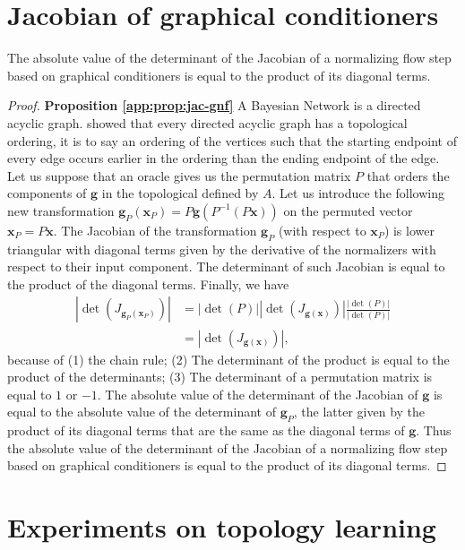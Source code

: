 \section{Jacobian of graphical conditioners}\label{app:proof-jac-gnf}
\begin{proposition}\label{app:prop:jac-gnf}
The absolute value of the determinant of the Jacobian of a normalizing flow step based on graphical conditioners is equal to the product of its diagonal terms. 
\end{proposition}
\begin{proof} \textbf{Proposition \ref{app:prop:jac-gnf}}
A Bayesian Network is a directed acyclic graph. \cite{sedgewick2011algorithms} showed that every directed acyclic graph has a topological ordering, it is to say an ordering of the vertices such that the starting endpoint of every edge occurs earlier in the ordering than the ending endpoint of the edge. Let us suppose that an oracle gives us the permutation matrix $P$ that orders the components of $\mathbf{g}$ in the topological defined by $A$. Let us introduce the following new transformation $\mathbf{g}_P(\mathbf{x}_P) = P\mathbf{g}(P
^{-1}(P\mathbf{x}))$ on the permuted vector $\mathbf{x}_P = P\mathbf{x}$. The Jacobian of the transformation $\mathbf{g}_P$ (with respect to $\mathbf{x}_P$) is lower triangular with diagonal terms given by the derivative of the normalizers with respect to their input component. The determinant of such Jacobian is equal to the product of the diagonal terms. Finally, we have
\begin{align*}
    |\det(J_{\mathbf{g}_P(\mathbf{x}_P)})| &= |\det(P)||\det(J_{\mathbf{g}(\mathbf{x})})| \frac{|\det(P)|}{|\det(P)|}\\
    &= |\det(J_{\mathbf{g}(\mathbf{x})})|,
\end{align*}
because of (1) the chain rule; (2) The determinant of the product is equal to the product of the determinants; (3) The determinant of a permutation matrix is equal to $1$ or $-1$.
The absolute value of the determinant of the Jacobian of $\mathbf{g}$ is equal to the absolute value of the determinant of $\mathbf{g}_P$, the latter given by the product of its diagonal terms that are the same as the diagonal terms of $\mathbf{g}$. Thus the absolute value of the determinant of the Jacobian of a normalizing flow step based on graphical conditioners is equal to the product of its diagonal terms.
\end{proof}
\section{Experiments on topology learning}\label{app:top_dataset}
